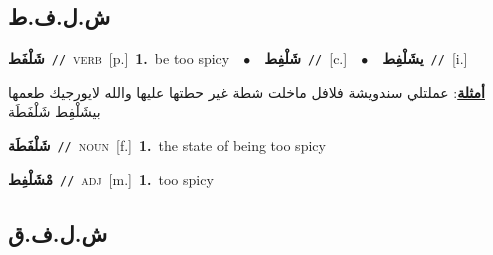 \documentclass[10pt,a4paper,twoside]{article} %
\begin{document}
\begin{multicols}{2}
\vspace{-3mm}
\subsection*{\color{blue}\foreignlanguage{arabic}{ش.ل.ف.ط}\color{blue}{}} 

{\setlength\topsep{0pt}\textbf{\foreignlanguage{arabic}{شَلْفَط}}\ {\color{gray}\texttt{//}\color{black}}\ \textsc{verb}\ [p.]\ \textbf{1.}~be too spicy\ \ $\bullet$\ \ \setlength\topsep{0pt}\textbf{\foreignlanguage{arabic}{شَلْفِط}}\ {\color{gray}\texttt{//}\color{black}}\ [c.]\ \ $\bullet$\ \ \setlength\topsep{0pt}\textbf{\foreignlanguage{arabic}{يشَلْفِط}}\ {\color{gray}\texttt{//}\color{black}}\ [i.]\  \begin{flushright}\color{gray}\foreignlanguage{arabic}{\textbf{\underline{\foreignlanguage{arabic}{أمثلة}}}: عملتلي سندويشة فلافل ماخلت شطة غير حطتها عليها والله لايورجيك طعمها بيشَلْفِط شَلْفَطَة}\end{flushright}\color{black}} \vspace{2mm}

{\setlength\topsep{0pt}\textbf{\foreignlanguage{arabic}{شَلْفَطَة}}\ {\color{gray}\texttt{//}\color{black}}\ \textsc{noun}\ [f.]\ \textbf{1.}~the state of being too spicy\ } \vspace{2mm}

{\setlength\topsep{0pt}\textbf{\foreignlanguage{arabic}{مْشَلْفِط}}\ {\color{gray}\texttt{//}\color{black}}\ \textsc{adj}\ [m.]\ \textbf{1.}~too spicy\ } \vspace{2mm}

\vspace{-3mm}
\subsection*{\color{blue}\foreignlanguage{arabic}{ش.ل.ف.ق}\color{blue}{}} 


\end{multicols}
\end{document}

